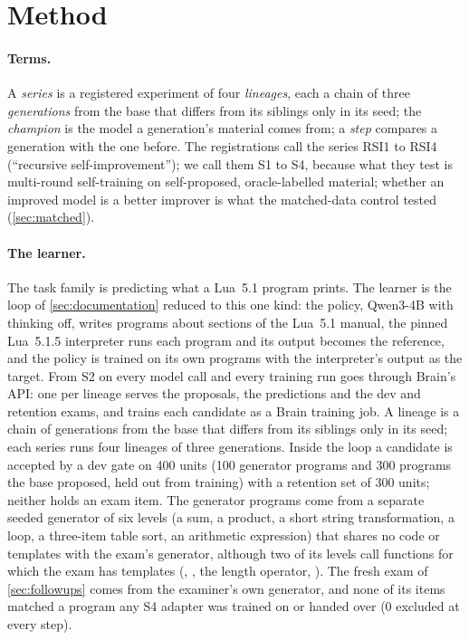
\section{Method}\label{sec:method}\label{sec:rsi-design}

\paragraph{Terms.} A \emph{series} is a registered experiment of four \emph{lineages}, each a chain
of three \emph{generations} from the base that differs from its siblings only in its seed; the
\emph{champion} is the model a generation's material comes from; a \emph{step} compares a generation with
the one before. The registrations call the series RSI1 to RSI4 (``recursive self-improvement''); we call
them S1 to S4, because what they test is multi-round self-training on self-proposed, oracle-labelled
material; whether an improved model is a better improver is what the matched-data control tested
(\cref{sec:matched}).

\paragraph{The learner.} The task family is predicting what a Lua~5.1 program prints. The learner is
the loop of \cref{sec:documentation} reduced to this one kind: the policy, Qwen3-4B with thinking off,
writes programs about sections of the Lua~5.1 manual, the pinned Lua~5.1.5 interpreter runs each
program and its output becomes the reference, and the policy is trained on its own programs with the
interpreter's output as the target. From S2 on every model call and every training run goes through
Brain's API: one  per lineage serves the proposals, the predictions and the dev and
retention exams, and trains each candidate as a Brain training job. A lineage is a chain
of generations from the base that differs from its siblings only in its seed; each series runs four
lineages of three generations. Inside the loop a candidate is accepted by a dev gate on 400 units
(100 generator programs and 300 programs the base proposed, held out from training) with a retention
set of 300 units; neither holds an exam item. The generator programs come from a separate seeded generator of six levels
(a sum, a product, a short string transformation, a loop, a three-item table sort, an arithmetic
expression) that shares no code or templates with the exam's generator, although two of its levels call
functions for which the exam has templates (, , the length
operator, ). The fresh exam of \cref{sec:followups} comes from the examiner's
own generator, and none of its items matched a program any S4 adapter was trained on or handed over (0
excluded at every step).

